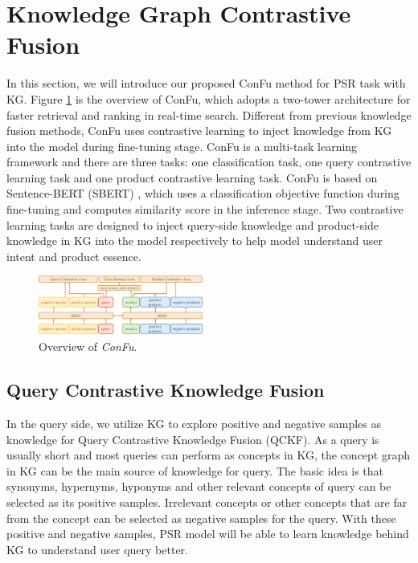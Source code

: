 \section{Knowledge Graph Contrastive Fusion}

In this section, we will introduce our proposed ConFu method for PSR task with KG. Figure \ref{kgconfu} is the overview of ConFu, which adopts a two-tower architecture for faster retrieval and ranking in real-time search. Different from previous knowledge fusion methods, ConFu uses contrastive learning to inject knowledge from KG into the model during fine-tuning stage. ConFu is a multi-task learning framework and there are three tasks: one classification task, one query contrastive learning task and one product contrastive learning task. ConFu is based on Sentence-BERT (SBERT) \cite{reimers2019sentence}, which uses a classification objective function during fine-tuning and computes similarity score in the inference stage. Two contrastive learning tasks are designed to inject query-side knowledge and product-side knowledge in KG into the model respectively to help model understand user intent and product essence. 

\begin{figure}[thbp] \centering
    \includegraphics[width=0.48\textwidth]{kgconfu_overview_4}
    \caption{Overview of \textit{ConFu}.}
    \label{kgconfu}
\end{figure}


\subsection{Query Contrastive Knowledge Fusion}
In the query side, we utilize KG to explore positive and negative samples as knowledge for Query Contrastive Knowledge Fusion (QCKF). As a query is usually short and most queries can perform as concepts in KG, the concept graph in KG can be the main source of knowledge for query. The basic idea is that synonyms, hypernyms, hyponyms and other relevant concepts of query can be selected as its positive samples. Irrelevant concepts or other concepts that are far from the concept can be selected as negative samples for the query. With these positive and negative samples, PSR model will be able to learn knowledge behind KG to understand user query better.

